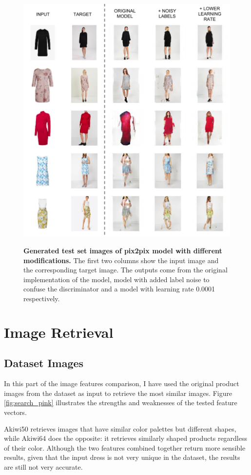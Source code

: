 \documentclass[12pt]{report}
\begin{document}
\begin{figure}[!h]
\centering
{\includegraphics[width=.8\linewidth]{04_experiments/pix2pix/results}}
\caption{\label{fig:pix2pix_results} \textbf{Generated test set images of pix2pix model with different modifications.} The first two columns show the input image and the corresponding target image. The outputs come from the original implementation of the model, model with added label noise to confuse the discriminator and a model with learning rate 0.0001 respectively.}
\end{figure}

\pagebreak
\section{Image Retrieval}

\subsection{Dataset Images}
In this part of the image features comparison, I have used the original product images from the dataset as input to retrieve the most similar images. Figure \ref{fig:search_pink} illustrates the strengths and weaknesses of the tested feature vectors. 

Akiwi50 retrieves images that have similar color palettes but different shapes, while Akiwi64 does the opposite: it retrieves similarly shaped products regardless of their color. Although the two features combined together return more sensible results, given that the input dress is not very unique in the dataset, the results are still not very accurate. 
\end{document}
